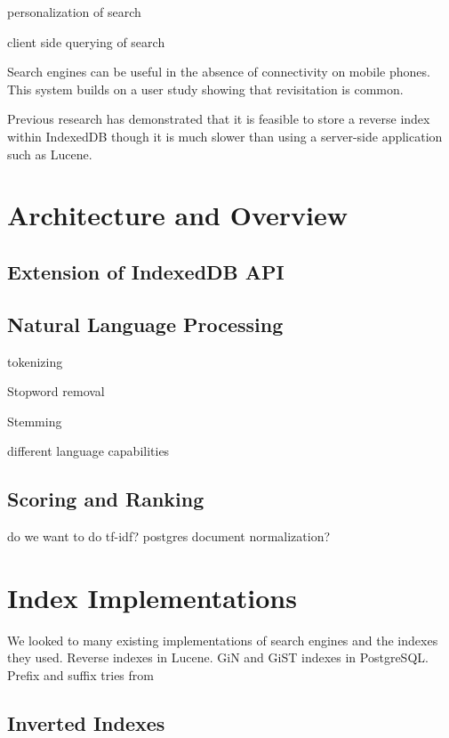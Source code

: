 \documentclass{vldb}
\begin{document}
personalization of search
\cite{teevan2005personalizing}

client side querying of search
\cite{bozzon2010liquid}


Search engines can be useful in the absence of connectivity on mobile phones. This system builds on a user study showing that revisitation is common.
\cite{balasubramanian2012findall}

Previous research has demonstrated that it is feasible to store a reverse index within IndexedDB
\cite{lin:jscene} though it is much slower than using a server-side application such as Lucene.




\section{Architecture and Overview}

\subsection{Extension of IndexedDB API}



\subsection{Natural Language Processing}

tokenizing

Stopword removal

Stemming

different language capabilities

\subsection{Scoring and Ranking}

do we want to do tf-idf? postgres document normalization?



\section{Index Implementations}

We looked to many existing implementations of search engines and the indexes they used. Reverse indexes in Lucene. GiN and GiST indexes in PostgreSQL. Prefix and suffix tries from 

\subsection{Inverted Indexes}
\end{document}
